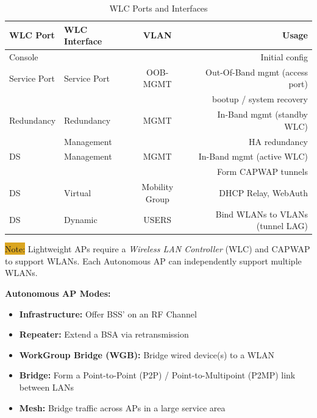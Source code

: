 \documentclass[12pt]{article}
\newcommand{\note}[1]{\colorbox{#1}{Note:}}
\begin{document}
	\begin{table}[H]
	\centering
	\caption{WLC Ports and Interfaces \label{tab:WLC PORTS}}
	\begin{tabular}{llcr}
	\hline
	\textbf{WLC Port}	& \textbf{WLC Interface}	& \textbf{VLAN}		& \textbf{Usage}\\\hline
	Console		&					&				& Initial config\\\hline
	Service Port		& Service Port			& OOB-MGMT		& Out-Of-Band mgmt (access port)\\
				&					&				& bootup / system recovery\\\hline
	Redundancy	& Redundancy			& MGMT			& In-Band mgmt (standby WLC)\\
				& Management			&				& HA redundancy\\\hline
	DS			& Management			& MGMT			& In-Band mgmt (active WLC)\\
				&					&				& Form CAPWAP tunnels\\\hline
	DS			& Virtual				& Mobility Group		& DHCP Relay, WebAuth\\\hline
	DS			& Dynamic				& USERS			& Bind WLANs to VLANs (tunnel LAG)\\\hline
	\end{tabular}\end{table}
	\note{Goldenrod} Lightweight APs require a \textit{Wireless LAN Controller} (WLC) and CAPWAP to support WLANs. Each Autonomous AP can independently support multiple WLANs.

	\textbf{Autonomous AP Modes:}
	\begin{itemize} \itemsep -5pt
		\label{itm:AUTONOMOUS AP}
		\item{\textbf{Infrastructure:} Offer BSS' on an RF Channel}
		\item{\textbf{Repeater:} Extend a BSA via retransmission}
		\item{\textbf{WorkGroup Bridge (WGB):} Bridge wired device(s) to a WLAN}
		\item{\textbf{Bridge:} Form a Point-to-Point (P2P) / Point-to-Multipoint (P2MP) link between LANs}
		\item{\textbf{Mesh:} Bridge traffic across APs in a large service area}
	\end{itemize}
\end{document}
